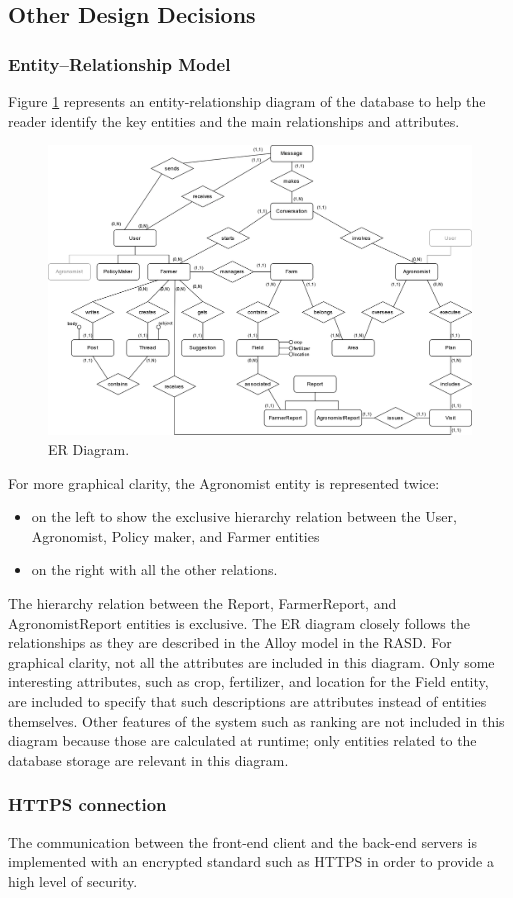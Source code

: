 \subsection{Other Design Decisions}

\subsubsection{Entity–Relationship Model}
Figure \ref{fig:ERDiagram} represents an entity-relationship diagram of the database to help the reader identify the key entities and the main relationships and attributes.

\begin{figure}[hbt!]
\centering
\includegraphics[width=\textwidth]{../images_diagrams/dd/er_diagram.png}
\caption{ER Diagram.}
\label{fig:ERDiagram}
\end{figure}

For more graphical clarity, the Agronomist entity is represented twice:
\begin{itemize}
	\item on the left to show the exclusive hierarchy relation between the User, Agronomist, Policy maker, and Farmer entities
	\item on the right with all the other relations. 
\end{itemize}

The hierarchy relation between the Report, FarmerReport, and AgronomistReport entities is exclusive. The ER diagram closely follows the relationships as they are described in the Alloy model in the RASD. For graphical clarity, not all the attributes are included in this diagram. Only some interesting attributes, such as crop, fertilizer, and location for the Field entity, are included to specify that such descriptions are attributes instead of entities themselves. Other features of the system such as ranking are not included in this diagram because those are calculated at runtime; only entities related to the database storage are relevant in this diagram.

\subsubsection{HTTPS connection}
The communication between the front-end client and the back-end servers is implemented with an encrypted standard such as HTTPS in order to provide a high level of security.
